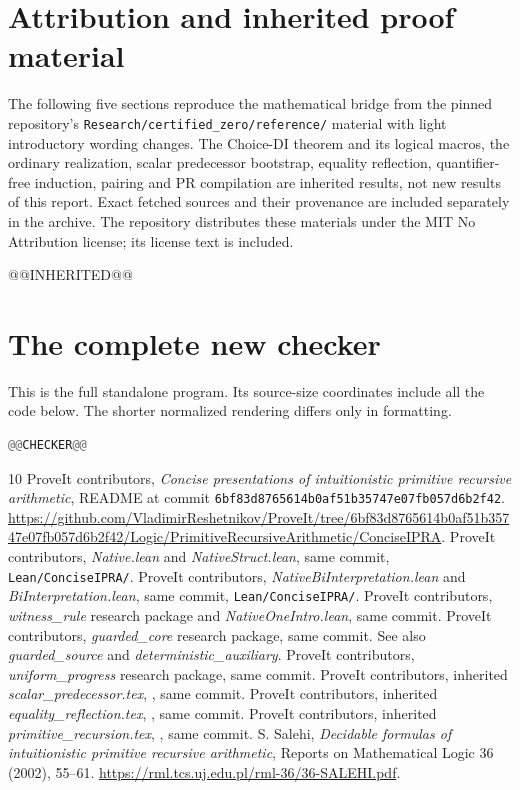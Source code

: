 \documentclass[11pt]{article}
\theoremstyle{definition}
\theoremstyle{remark}
\begin{document}
\appendix
\section{Attribution and inherited proof material}
\label{sec:attribution}

The following five sections reproduce the mathematical bridge from the
pinned repository's \texttt{Research/certified\_zero/reference/} material
with light introductory wording changes. The Choice-DI theorem and its
logical macros, the ordinary realization, scalar predecessor bootstrap,
equality reflection, quantifier-free induction, pairing and PR compilation
are inherited results, not new results of this report. Exact fetched
sources and their provenance are included separately in the archive.
The repository distributes these materials under the MIT No Attribution
license; its license text is included.

@@INHERITED@@

\section{The complete new checker}
\label{sec:listing}

This is the full standalone program. Its source-size coordinates include
all the code below. The shorter normalized rendering differs only in
formatting.
\begin{lstlisting}[language=Python]
@@CHECKER@@
\end{lstlisting}

\begin{thebibliography}{10}
 ProveIt contributors, \emph{Concise presentations of
intuitionistic primitive recursive arithmetic}, README at commit
\texttt{6bf83d8765614b0af51b35747e07fb057d6b2f42}.
\url{https://github.com/VladimirReshetnikov/ProveIt/tree/6bf83d8765614b0af51b35747e07fb057d6b2f42/Logic/PrimitiveRecursiveArithmetic/ConciseIPRA}.
 ProveIt contributors, \emph{Native.lean} and
\emph{NativeStruct.lean}, same commit, \texttt{Lean/ConciseIPRA/}.
 ProveIt contributors, \emph{NativeBiInterpretation.lean}
and \emph{BiInterpretation.lean}, same commit, \texttt{Lean/ConciseIPRA/}.
 ProveIt contributors, \emph{witness\_rule} research
package and \emph{NativeOneIntro.lean}, same commit.
 ProveIt contributors, \emph{guarded\_core} research
package, same commit. See also \emph{guarded\_source} and
\emph{deterministic\_auxiliary}.
 ProveIt contributors, \emph{uniform\_progress} research
package, same commit.
 ProveIt contributors, inherited
\emph{scalar\_predecessor.tex},
, same commit.
 ProveIt contributors, inherited
\emph{equality\_reflection.tex},
, same commit.
 ProveIt contributors, inherited
\emph{primitive\_recursion.tex},
, same commit.
 S. Salehi, \emph{Decidable formulas of intuitionistic
primitive recursive arithmetic}, Reports on Mathematical Logic 36
(2002), 55--61.
\url{https://rml.tcs.uj.edu.pl/rml-36/36-SALEHI.pdf}.
\end{thebibliography}
\end{document}
